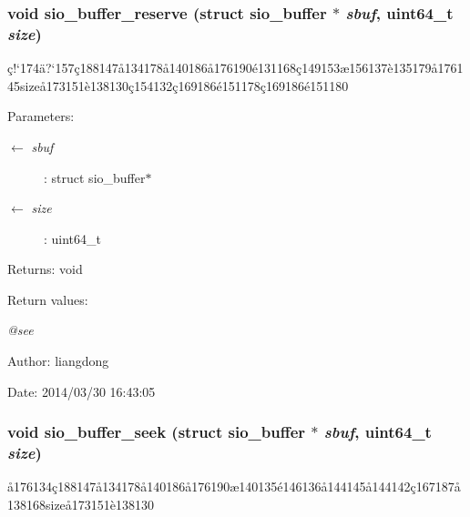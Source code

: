 \subsubsection{\setlength{\rightskip}{0pt plus 5cm}void sio\_\-buffer\_\-reserve (struct sio\_\-buffer $\ast$ {\em sbuf}, uint64\_\-t {\em size})}\label{sio__buffer_8h_a5}


\c{c}!`174\"{a}?`157\c{c}188147\aa{}134178\aa{}140186\aa{}176190\'{e}131168\c{c}149153\ae{}156137\`{e}135179\aa{}176145size\aa{}173151\`{e}138130\c{c}154132\c{c}169186\'{e}151178\c{c}169186\'{e}151180 

\begin{Desc}
\item[Parameters:]
\begin{description}
\item[\mbox{$\leftarrow$} {\em sbuf}]: struct sio\_\-buffer$\ast$ \item[\mbox{$\leftarrow$} {\em size}]: uint64\_\-t \end{description}
\end{Desc}
\begin{Desc}
\item[Returns:]void \end{Desc}
\begin{Desc}
\item[Return values:]
\begin{description}
\item[{\em @see}]\end{description}
\end{Desc}
\begin{Desc}
\item[Author:]liangdong \end{Desc}
\begin{Desc}
\item[Date:]2014/03/30 16:43:05 \end{Desc}
\subsubsection{\setlength{\rightskip}{0pt plus 5cm}void sio\_\-buffer\_\-seek (struct sio\_\-buffer $\ast$ {\em sbuf}, uint64\_\-t {\em size})}\label{sio__buffer_8h_a3}


\aa{}176134\c{c}188147\aa{}134178\aa{}140186\aa{}176190\ae{}140135\'{e}146136\aa{}144145\aa{}144142\c{c}167187\aa{}138168size\aa{}173151\`{e}138130 

